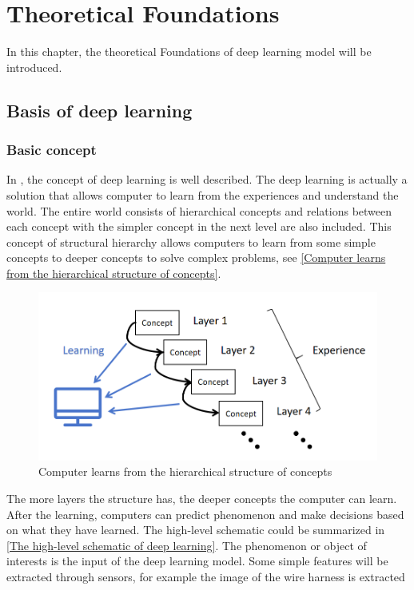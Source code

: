 \chapter{Theoretical Foundations}
In this chapter, the theoretical Foundations of deep learning model will be introduced. 
\section{Basis of deep learning}
\subsection{Basic concept}
    In \cite{Goodfellow-et-al-2016}, the concept of deep learning is well described. The deep learning is actually a solution that allows 
    computer to learn from the experiences and understand the world. The entire world consists of hierarchical concepts and relations between 
    each concept with the simpler concept in the next level are also included. This concept of structural hierarchy allows computers to learn 
    from some simple concepts to deeper concepts to solve complex problems, see \autoref{Computer learns from the hierarchical structure of concepts}.
    \begin{figure}
		\centering
		\includegraphics[width=0.9\linewidth]{example_images/ConceptDL}
		\caption{Computer learns from the hierarchical structure of concepts}
		\label{Computer learns from the hierarchical structure of concepts}
	  \end{figure}
    The more layers the structure has, the deeper concepts the computer can learn. After the learning, computers can predict phenomenon and make decisions 
    based on what they have learned. The high-level schematic could be summarized in \autoref{The high-level schematic of deep learning}. The phenomenon or object 
    of interests is the input of the deep learning model. Some simple features will be extracted through sensors, for example the image of the wire harness is extracted 
